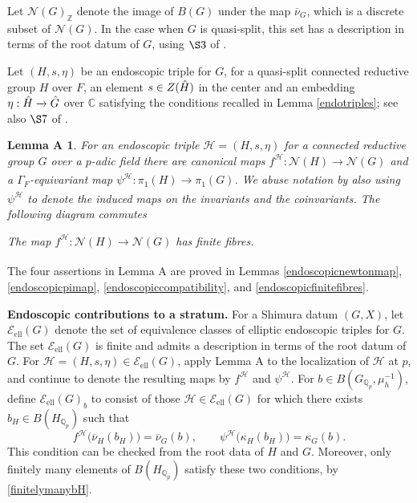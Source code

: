 \documentclass[11pt,a4paper]{article}
\newcommand{\Eell}{\mathcal{E}_{\mathrm{ell}}}
\theoremstyle{definition}
\theoremstyle{plain}
\theoremstyle{remark}
\theoremstyle{plain}
\newtheorem*{LemA}{Lemma A}
\begin{document}
Let $\mathcal{N}(G)_{\mathbb{Z}}$ denote the image of $B(G)$ under the map $\overline{\nu}_G$, which is a discrete subset of $\mathcal{N}(G)$. In the case when $G$ is quasi-split, this set has a description in terms of the root datum of $G$, using $\S 3$ of \cite{MR1781927}.

Let $(H,s,\eta)$ be an endoscopic triple for $G$, for a quasi-split connected reductive group $H$ over $F$, an element $s \in Z(\Hat{H})$ in the center and an embedding $\eta: \Hat{H} \xrightarrow[]{} \Hat{G}$ over $\mathbb{C}$ satisfying the conditions recalled in Lemma \ref{endotriples}; see also $\S 7$ of \cite{MR0757954}.

\begin{LemA}
For an endoscopic triple $\mathcal{H} =(H,s,\eta)$ for a connected reductive group $G$ over a $p$-adic field there are canonical maps $f^{\mathcal{H}}: \mathcal{N}(H) \xrightarrow[]{} \mathcal{N}(G)$ and a $\Gamma_F$-equivariant map $\psi^{\mathcal{H}}: \pi_1(H) \xrightarrow[]{} \pi_1(G)$. We abuse notation by also using $\psi^{\mathcal{H}}$ to denote the induced maps on the invariants and the coinvariants. The following diagram commutes
\begin{center}
\end{center}

The map $f^{\mathcal{H}}:\mathcal{N}(H) \xrightarrow[]{} \mathcal{N}(G)$ has finite fibres.
\end{LemA}

The four assertions in Lemma A are proved in Lemmas \ref{endoscopicnewtonmap}, \ref{endoscopicpimap}, \ref{endoscopiccompatibility}, and \ref{endoscopicfinitefibres}.

\textbf{Endoscopic contributions to a stratum.} 
For a Shimura datum $(G,X)$, let $\Eell(G)$ denote the set of equivalence classes of elliptic endoscopic triples for $G$. The set $\Eell(G)$ is finite and admits a description in terms of the root datum of $G$. For $\mathcal{H}=(H,s,\eta)\in\Eell(G)$, apply Lemma A to the localization of $\mathcal{H}$ at $p$, and continue to denote the resulting maps by $f^{\mathcal{H}}$ and $\psi^{\mathcal{H}}$. For $b\in B(G_{\mathbb{Q}_p},\mu_h^{-1})$, define $\Eell(G)_b$ to consist of those $\mathcal{H}\in\Eell(G)$ for which there exists $b_H\in B(H_{\mathbb{Q}_p})$ such that
$$
f^{\mathcal{H}}\bigl(\overline{\nu}_H(b_H)\bigr)=\overline{\nu}_G(b),
\qquad
\psi^{\mathcal{H}}\bigl(\kappa_H(b_H)\bigr)=\kappa_G(b).
$$
This condition can be checked from the root data of $H$ and $G$. Moreover, only finitely many elements of $B(H_{\mathbb{Q}_p})$ satisfy these two conditions, by \ref{finitelymanybH}.
\end{document}

